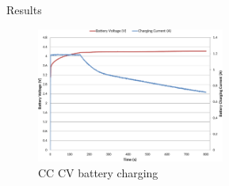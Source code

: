 \documentclass[aspectratio=169]{beamer}
\begin{document}
		\begin{frame}{Results}
			\begin{figure}[h]
				\centering
				\includegraphics[width=0.55\textwidth]{Battery CC CV (2).pdf}
				\caption{CC CV battery charging}
				\label{fig:mesh1}
			\end{figure}
		\end{frame}
			
\end{document}
